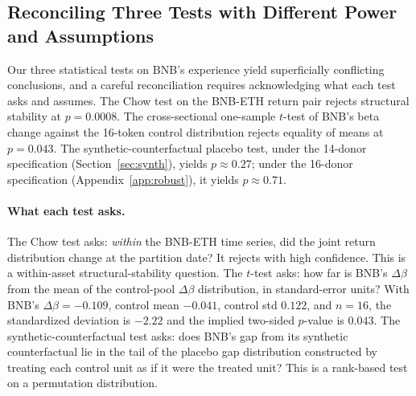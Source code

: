 \documentclass[11pt,a4paper]{article}
\begin{document}
\subsection{Reconciling Three Tests with Different Power and Assumptions}

Our three statistical tests on BNB's experience yield superficially conflicting conclusions, and a careful reconciliation requires acknowledging what each test asks and assumes. The Chow test on the BNB-ETH return pair rejects structural stability at $p=0.0008$. The cross-sectional one-sample $t$-test of BNB's beta change against the 16-token control distribution rejects equality of means at $p=0.043$. The synthetic-counterfactual placebo test, under the 14-donor specification (Section~\ref{sec:synth}), yields $p \approx 0.27$; under the 16-donor specification (Appendix~\ref{app:robust}), it yields $p \approx 0.71$.

\paragraph{What each test asks.} The Chow test asks: \emph{within} the BNB-ETH time series, did the joint return distribution change at the partition date? It rejects with high confidence. This is a within-asset structural-stability question. The $t$-test asks: how far is BNB's $\Delta\beta$ from the mean of the control-pool $\Delta\beta$ distribution, in standard-error units? With BNB's $\Delta\beta = -0.109$, control mean $-0.041$, control std $0.122$, and $n=16$, the standardized deviation is $-2.22$ and the implied two-sided $p$-value is $0.043$. The synthetic-counterfactual test asks: does BNB's gap from its synthetic counterfactual lie in the tail of the placebo gap distribution constructed by treating each control unit as if it were the treated unit? This is a rank-based test on a permutation distribution.
\end{document}

